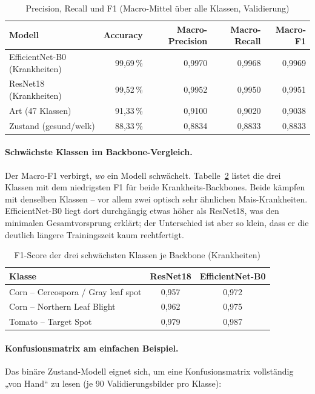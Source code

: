 \documentclass[11pt,a4paper]{article}
\begin{document}
\begin{table}[h]
\centering
\caption{Precision, Recall und F1 (Macro-Mittel über alle Klassen, Validierung)}
\label{tab:f1}
\small
\begin{tabular}{@{}lrrrr@{}}
\toprule
\textbf{Modell} & \textbf{Accuracy} & \textbf{Macro-Precision} & \textbf{Macro-Recall} & \textbf{Macro-F1} \\
\midrule
EfficientNet-B0 (Krankheiten) & 99{,}69\,\% & 0{,}9970 & 0{,}9968 & 0{,}9969 \\
ResNet18 (Krankheiten)        & 99{,}52\,\% & 0{,}9952 & 0{,}9950 & 0{,}9951 \\
Art (47 Klassen)              & 91{,}33\,\% & 0{,}9100 & 0{,}9020 & 0{,}9038 \\
Zustand (gesund/welk)         & 88{,}33\,\% & 0{,}8834 & 0{,}8833 & 0{,}8833 \\
\bottomrule
\end{tabular}
\end{table}

\paragraph{Schwächste Klassen im Backbone-Vergleich.}
Der Macro-F1 verbirgt, \emph{wo} ein Modell schwächelt. Tabelle~\ref{tab:worstf1}
listet die drei Klassen mit dem niedrigsten F1 für beide Krankheits-Backbones.
Beide kämpfen mit denselben Klassen -- vor allem zwei optisch sehr ähnlichen
Mais-Krankheiten. EfficientNet-B0 liegt dort durchgängig etwas höher als
ResNet18, was den minimalen Gesamtvorsprung erklärt; der Unterschied ist aber so
klein, dass er die deutlich längere Trainingszeit kaum rechtfertigt.

\begin{table}[h]
\centering
\caption{F1-Score der drei schwächsten Klassen je Backbone (Krankheiten)}
\label{tab:worstf1}
\small
\begin{tabular}{@{}lcc@{}}
\toprule
\textbf{Klasse} & \textbf{ResNet18} & \textbf{EfficientNet-B0} \\
\midrule
Corn -- Cercospora / Gray leaf spot & 0{,}957 & 0{,}972 \\
Corn -- Northern Leaf Blight        & 0{,}962 & 0{,}975 \\
Tomato -- Target Spot               & 0{,}979 & 0{,}987 \\
\bottomrule
\end{tabular}
\end{table}

\paragraph{Konfusionsmatrix am einfachen Beispiel.}
Das binäre Zustand-Modell eignet sich, um eine Konfusionsmatrix vollständig
„von Hand“ zu lesen (je 90 Validierungsbilder pro Klasse):
\end{document}
